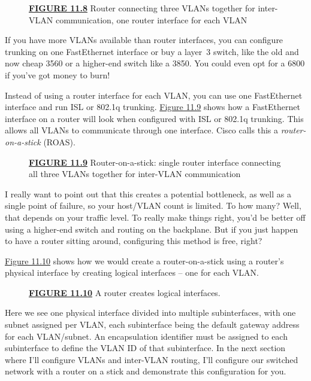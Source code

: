 \documentclass[b5paper,11pt]{memoir}
\begin{document}
\begin{figure}
\centering
\caption{{\protect\hyperlink{c11.xhtmlux5cux23figureanchor11-8}{\textbf{FIGURE
11.8}} Router connecting three VLANs together for inter-VLAN
communication, one router interface for each VLAN}}
\end{figure}

If you have more VLANs available than router interfaces, you can
configure trunking on one FastEthernet interface or buy a layer~3
switch, like the old and now cheap 3560 or a higher-end switch like a
3850. You could even opt for a 6800 if you've got money to burn!

Instead of using a router interface for each VLAN, you can use one
FastEthernet interface and run ISL or 802.1q trunking.
\protect\hyperlink{c11.xhtmlux5cux23figure11-9}{Figure 11.9} shows how a
FastEthernet interface on a
router will look when
configured with ISL or 802.1q trunking. This allows all VLANs to
communicate through one interface. Cisco calls this a \emph{router-on-a-stick}
(ROAS).

\begin{figure}
\centering
\caption{{\protect\hyperlink{c11.xhtmlux5cux23figureanchor11-9}{\textbf{FIGURE
11.9}} Router-on-a-stick: single router interface connecting all three
VLANs together for inter-VLAN communication}}
\end{figure}

I really want to point out that this creates a potential bottleneck, as
well as a single point of failure, so your host/VLAN count is limited.
To how many? Well, that depends on your traffic level. To really make
things right, you'd be better off using a higher-end switch and routing
on the backplane. But if you just happen to have a router sitting
around, configuring this method is free, right?

\protect\hyperlink{c11.xhtmlux5cux23figure11-10}{Figure 11.10} shows how
we would create a router-on-a-stick using a router's physical interface
by creating logical interfaces -- one for each VLAN.

\begin{figure}
\centering
\caption{{\protect\hyperlink{c11.xhtmlux5cux23figureanchor11-10}{\textbf{FIGURE
11.10}} A router creates logical interfaces.}}
\end{figure}

Here we see one physical interface divided into multiple subinterfaces,
with one subnet assigned per VLAN, each subinterface being the default
gateway address for each VLAN/subnet. An encapsulation identifier must
be assigned to each subinterface to define the VLAN ID of that
subinterface. In the next section where I'll configure VLANs and
inter-VLAN routing, I'll configure our switched network with a router on
a stick and demonstrate this configuration for you.
\end{document}
